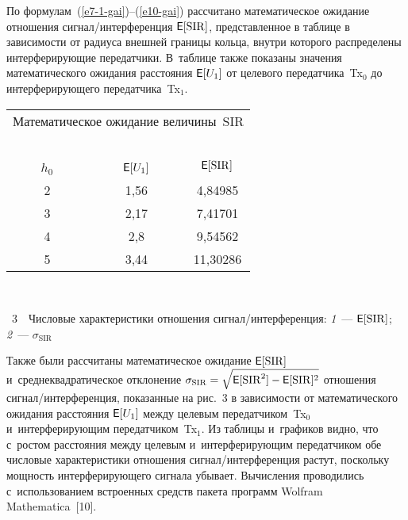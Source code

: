 \begin{multicols}{2}
  По формулам~(\ref{e7-1-gai})--(\ref{e10-gai}) рассчитано математическое
ожидание отношения сигнал/ин\-тер\-фе\-рен\-ция ${\sf E}[\mathrm{SIR}]$, представленное в
таблице в зависимости от радиуса внешней границы кольца, внутри которого
распределены интерферирующие передатчики. В~таблице также показаны
значения математического ожидания расстояния  ${\sf E}[U_1]$ от целевого
передатчика~Tx$_0$ до интерферирующего передатчика~Tx$_1$.

  \begin{center}
  \begin{tabular}{|c|c|c|}
  \multicolumn{3}{p{48mm}}{Математическое ожидание величины~SIR}\\
  \multicolumn{3}{c}{\ }\\[-5pt]
  \hline
\ \ \ \ $h_0$\ \ \ \ &\ \ \ \ ${\sf E}[U_1]$\ \ \ \ &${\sf E}[\mathrm{SIR}]$\\
\hline
2&1,56&4,84985\\
3&2,17&7,41701\\
4&2,8\hphantom{9}&9,54562\\
5&3,44&11,30286\hphantom{9}\\
\hline
\end{tabular}
\end{center}

\begin{center}  %
\vspace*{18pt}
\mbox{%
 \epsfxsize=77.754mm
 }
 \end{center}


\noindent
{{\figurename~3}\ \ \small{Числовые характеристики отношения сигнал/ин\-тер\-фе\-рен\-ция: \textit{1}~---
${\sf E}[\mathrm{SIR}]$; \textit{2}~--- $\sigma_{\mathrm{SIR}}$}}

\vspace*{18pt}

  Также были рассчитаны математическое ожидание ${\sf E}[\mathrm{SIR}]$
  и~среднеквадратическое \mbox{отклонение} $\sigma_{\mathrm{SIR}}\hm= \sqrt{{\sf E}[\mathrm{SIR}^2]-
{\sf E}[\mathrm{SIR}]^2}$ отношения сигнал/ин\-тер\-фе\-рен\-ция, показанные на рис.~3 в
зави\-си\-мости от математического ожидания расстояния ${\sf E}[U_1]$ между
целевым передатчиком~Tx$_0$ и~интерферирующим передатчиком~Tx$_1$. Из
таблицы и~графиков видно, что с~ростом расстояния между целевым
и~интерферирующим передатчиком обе \mbox{числовые} характеристики отношения
сиг\-нал/ин\-тер\-фе\-рен\-ция растут, поскольку мощность интерферирующего сигнала
убывает. Вычисления проводились с~использованием встроенных средств
пакета программ Wolfram Mathematica~[10].




\end{multicols}

